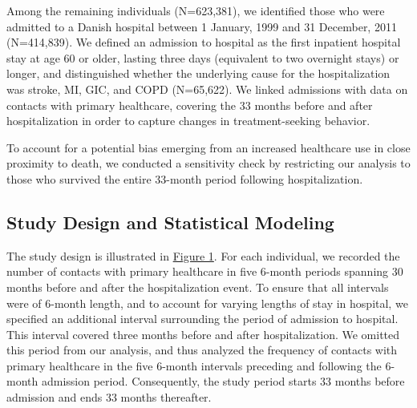 Among the remaining individuals (N=623,381), we identified those who were 
admitted to a Danish hospital between 1 January, 1999 and 31 December, 2011 
(N=414,839). We defined an admission to hospital as the first inpatient hospital 
stay at age 60 or older, lasting three days (equivalent to two overnight stays) 
or longer, and distinguished whether the underlying cause for the hospitalization 
was stroke, MI, GIC, and COPD (N=65,622). We linked admissions with data on 
contacts with primary healthcare, covering the 33 months before and after 
hospitalization in order to capture changes in treatment-seeking behavior.

To account for a potential bias emerging from an increased healthcare use 
in close proximity to death,\citep{werblow2007population} we conducted a 
sensitivity check by restricting our analysis to those who survived the 
entire 33-month period following hospitalization. \\

\subsection{Study Design and Statistical Modeling}

The study design is illustrated in \hyperref[ch3:fig1]{Figure 1}. For each individual, we recorded 
the number of contacts with primary healthcare in five 6-month periods spanning 
30 months before and after the hospitalization event. To ensure that all intervals 
were of 6-month length, and to account for varying lengths of stay in hospital, 
we specified an additional interval surrounding the period of admission to hospital. 
This interval covered three months before and after hospitalization. We omitted 
this period from our analysis, and thus analyzed the frequency of contacts with 
primary healthcare in the five 6-month intervals preceding and following the 
6-month admission period. Consequently, the study period starts 33 months before 
admission and ends 33 months thereafter.\\

